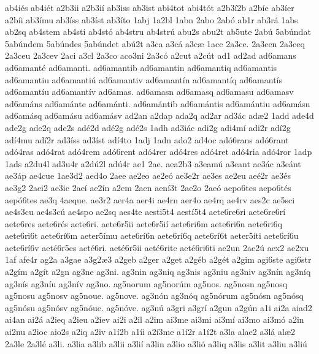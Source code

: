 {ab4i^^e9s
ab4i^^e9t
a2b3ii
a2b3i^^ed
ab3iss
ab3ist
abi4tot
abi4t^^f3t
a2b3^^ed2b
a2b^^ede
ab3^^eder
a2b^^edi
ab3^^edmu
ab3^^edss
ab3^^edst
ab3^^edto
1abj
1a2bl
1abn
2abo
2ab^^f3
ab1r
ab3r^^e1
1abs
ab2sq
ab4stem
ab4sti
ab4st^^f3
ab4stru
ab4str^^fa
abu2s
abu2t
ab5ute
2ab^^fa
5ab^^fandat
5ab^^fandem
5ab^^fandes
5ab^^fandet
ab^^fa2t
a3ca
a3c^^e1
a3c^^e6
1acc
2a3ce.
2a3cen
2a3ceq
2a3ceu
2a3cev
2aci
a3cl
2a3co
aco3ni
2a3c^^f3
a2cut
a2c^^fat
ad1
ad2ad
ad6amans
ad6amant^^e9
ad6amanti.
ad6amantib
ad6amantin
ad6amantiq
ad6amantis
ad6amantiu
ad6amanti^^fa
ad6amantiv
ad6amant^^edn
ad6amant^^edq
ad6amant^^eds
ad6amant^^edu
ad6amant^^edv
ad6amas.
ad6amasn
ad6amasq
ad6amasu
ad6amasv
ad6am^^e1ns
ad6am^^e1nte
ad6am^^e1nti.
ad6am^^e1ntib
ad6am^^e1ntis
ad6am^^e1ntiu
ad6am^^e1sn
ad6am^^e1sq
ad6am^^e1su
ad6am^^e1sv
ad2an
a2dap
ada2q
ad2ar
ad3^^e1c
ad^^e62
1add
ade4d
ade2g
ade2q
ade2s
ad^^e92d
ad^^e92g
ad^^e92s
1adh
ad3i^^e1c
adi2g
adi4m^^ed
adi2r
ad^^ed2g
ad^^ed4mu
ad^^ed2r
ad3^^edss
ad3^^edst
ad^^ed4to
1adj
1adn
ado2
ad4oc
ad^^f36rans
ad^^f36rant
ad^^f34ras
ad^^f34rat
ad^^f34rem
ad^^f36rent
ad^^f34rer
ad^^f34res
ad^^f34ret
ad^^f34ria
ad^^f34ror
1adp
1ads
a2du4l
ad3u4r
a2d^^fa2l
ad^^fa4r
ae1
2ae.
aea2b3
a3eam^^fa
a3eant
ae3^^e1c
a3e^^e1nt
ae3^^e1p
ae4cue
1ae3d2
aed4o
2aee
ae2eo
ae2e^^f3
ae3e2r
ae3es
ae2eu
ae^^e92r
ae3^^e9s
ae3g2
2aei2
ae3ic
2ae^^ed
ae2^^edn
a2em
2aen
aen^^ed3t
2ae2o
2ae^^f3
aepo6tes
aepo6t^^e9s
aep^^f36tes
ae3q
4aeque.
ae3r2
aer4a
aer4i
ae4rn
aer4o
ae4rq
ae4rv
aes2c
ae5sci
ae4s3cu
ae4s3c^^fa
ae4spo
ae2sq
aes4te
aesti5t4
aest^^ed5t4
aete6re6ri
aete6re6r^^ed
aete6res
aete6r^^e9s
aete6ri.
aete6r5ii
aete6r5i^^ed
aete6ri6m
aete6ri6n
aete6ri6q
aete6ri6t
aete6r^^ed6m
aeter5^^edmu
aete6r^^ed6n
aete6r^^ed6q
aete6r^^ed6t
aeter5^^edti
aete6r^^ed6u
aete6r^^ed6v
aet^^e96r5es
aet^^e96ri.
aet^^e96r5ii
aet^^e96rite
aet^^e96ri6ti
ae2un
2ae2^^fa
aex2
ae2xu
1af
afe4r
ag2a
a3gae
a3g2^^e63
a2geb
a2ger
a2get
a2g^^e9b
a2g^^e9t
a2gim
agi6ste
agi6str
a2g^^edm
a2g^^edt
a2gn
ag3ne
ag3ni.
ag3nin
ag3niq
ag3nis
ag3niu
ag3niv
ag3n^^edn
ag3n^^edq
ag3n^^eds
ag3n^^edu
ag3n^^edv
ag3no.
ag5norum
ag5nor^^fam
ag5nos.
ag5nosn
ag5nosq
ag5nosu
ag5nosv
ag5noue.
ag5nove.
ag3n^^f3n
ag3n^^f3q
ag5n^^f3rum
ag5n^^f3sn
ag5n^^f3sq
ag5n^^f3su
ag5n^^f3sv
ag5n^^f3ue.
ag5n^^f3ve.
ag3n^^fa
a3gri
a3gr^^ed
a2gun
a2g^^fan
a1i
ai2a
aiad2
ai4an
ai2^^e1
a2ieq
a2ieu
a2iev
ai2i
a2il
a2im
ai3me
ai3mi
ai3m^^ed
ai3mo
ai3m^^f3
a2in
ai2nu
a2ioc
aio2s
a2iq
a2iv
a1^^ed2b
a1^^edi
a2^^ed3me
a1^^ed2r
a1^^ed2t
a3la
alae2
a3l^^e1
al^^e62
2a3le
2a3l^^e9
a3li.
a3lia
a3lib
a3lii
a3li^^ed
a3lin
a3lio
a3li^^f3
a3liq
a3lis
a3lit
a3liu
a3li^^fa
}
